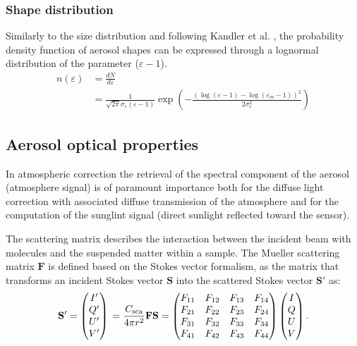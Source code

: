 \documentclass{article}
\begin{document}
\subsubsection{Shape distribution}
 Similarly to the size distribution and following Kandler et al. \citeyear{Kandler2007}, the probability density function of aerosol shapes can be expressed through a lognormal distribution of the parameter ($\varepsilon-1$).
                                                        	\begin{equation}   
                                                            \begin{split}
   n\left( \varepsilon  \right)&=\frac{dN}{d\varepsilon } \\
  &=\frac{1}{\sqrt{2\pi }{{\sigma }_{\varepsilon }}\left( \varepsilon -1 \right)}\exp \left( -\frac{{{\left( \log \left( \varepsilon -1 \right)-\log \left( {{\varepsilon }_{m}}-1 \right) \right)}^{2}}}{2\sigma _{\varepsilon }^{2}} \right) 
\end{split}
\end{equation}



\subsection{Aerosol optical properties} \label{aerosol}

In atmospheric correction the retrieval of the spectral component of the aerosol (atmosphere signal) is of paramount importance both for the diffuse light correction with associated diffuse transmission of the atmosphere and for the computation of the sunglint signal (direct sunlight reflected toward the sensor).

The scattering matrix describes the interaction between the incident beam with molecules and the suspended matter within a sample. The Mueller scattering matrix \textbf{$\mathbf{F}$} is defined based on the Stokes vector formalism, as the matrix that transforms an incident Stokes vector $\mathbf{S}$ into the scattered Stokes vector $\mathbf{S'}$ as:
\begin{equation}   
\mathbf{S'} = \begin{pmatrix} I' \\ Q' \\ U' \\ V' \end{pmatrix} \\ 
= \dfrac{C_{\text{sca}}}{4 \pi r^2} \mathbf{F S} = \begin{pmatrix} F_{11} & F_{12} & F_{13} & F_{14} \\ F_{21} & F_{22} & F_{23} & F_{24} \\ F_{31} & F_{32} & F_{33} & F_{34} \\ F_{41} & F_{42} & F_{43} & F_{44} \end{pmatrix} \begin{pmatrix} I \\ Q \\ U \\ V \end{pmatrix}.
\label{eq:general_scatmat}

\end{equation}
\end{document}
